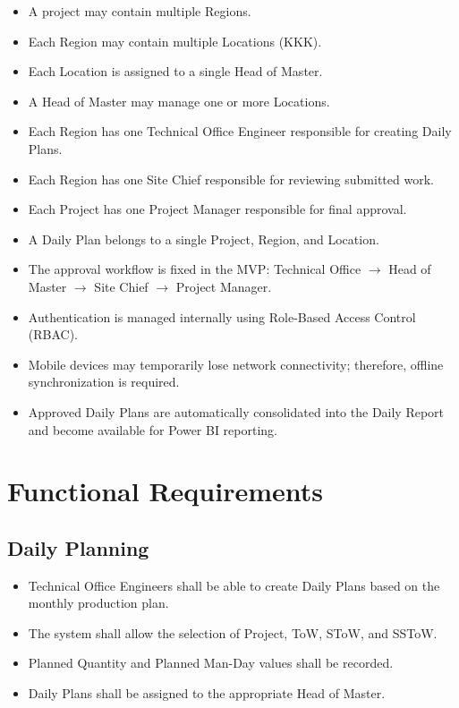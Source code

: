 \documentclass[11pt]{article}
\begin{document}
\begin{itemize}
    \item A project may contain multiple Regions.
    \item Each Region may contain multiple Locations (KKK).
    \item Each Location is assigned to a single Head of Master.
    \item A Head of Master may manage one or more Locations.
    \item Each Region has one Technical Office Engineer responsible for creating
          Daily Plans.
    \item Each Region has one Site Chief responsible for reviewing submitted
          work.
    \item Each Project has one Project Manager responsible for final approval.
    \item A Daily Plan belongs to a single Project, Region, and Location.
    \item The approval workflow is fixed in the MVP: Technical Office
          $\rightarrow$ Head of Master $\rightarrow$ Site Chief
          $\rightarrow$ Project Manager.
    \item Authentication is managed internally using Role-Based Access Control
          (RBAC).
    \item Mobile devices may temporarily lose network connectivity; therefore,
          offline synchronization is required.
    \item Approved Daily Plans are automatically consolidated into the Daily
          Report and become available for Power BI reporting.
\end{itemize}

\section{Functional Requirements}

\subsection{Daily Planning}

\begin{itemize}
    \item Technical Office Engineers shall be able to create Daily Plans based
          on the monthly production plan.
    \item The system shall allow the selection of Project, ToW, SToW, and
          SSToW.
    \item Planned Quantity and Planned Man-Day values shall be recorded.
    \item Daily Plans shall be assigned to the appropriate Head of Master.
\end{itemize}
\end{document}
